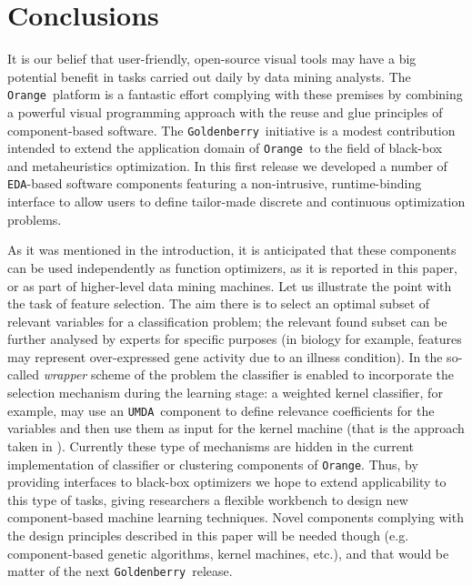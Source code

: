 \documentclass{sig-alternate}
\newcommand{\Orange}{\texttt{Orange}}
\newcommand{\GB}{\texttt{Goldenberry}}
\newcommand{\UMDA}{\texttt{UMDA}}
\newcommand{\EDA}{\texttt{EDA}}
\begin{document}
\section{Conclusions}
\label{sec:conclusions}

It is our belief that user-friendly, open-source visual tools may have a big potential benefit in tasks carried out daily by data mining analysts. The \Orange~platform is a fantastic effort complying with these premises by combining a powerful visual programming approach with the reuse and glue principles of component-based software. The \GB~initiative is a modest contribution intended to extend the application domain of \Orange~to the field of black-box and metaheuristics optimization. In this first release we developed a number of \EDA-based software components featuring a non-intrusive, runtime-binding interface to allow users to define tailor-made discrete and continuous optimization problems. 

As it was mentioned in the introduction, it is anticipated that these components can be used independently as function optimizers, as it is reported in this paper, or as part of higher-level data mining machines. Let us illustrate the point with the task of feature selection. The aim there is to select an optimal subset of relevant variables for a classification problem; the relevant found subset can be further analysed by experts for specific purposes (in biology for example, features may represent over-expressed gene activity due to an illness condition). In the so-called \textit{wrapper} scheme of the problem \cite{Saeys2007} the classifier is enabled to incorporate the selection mechanism during the learning stage: a weighted kernel classifier, for example, may use an \UMDA~component to define relevance coefficients for the variables and then use them as input for the kernel machine (that is the approach taken in \cite{Rojas2008}). Currently these type of mechanisms are hidden in the current implementation of classifier or clustering components of \Orange. Thus, by providing interfaces to black-box optimizers we hope to extend applicability to this type of tasks, giving researchers a flexible workbench to design new component-based machine learning techniques. Novel components complying with the design principles described in this paper will be needed though (e.g. component-based genetic algorithms, kernel machines, etc.), and that would be matter of the next \GB~release.

\end{document}
